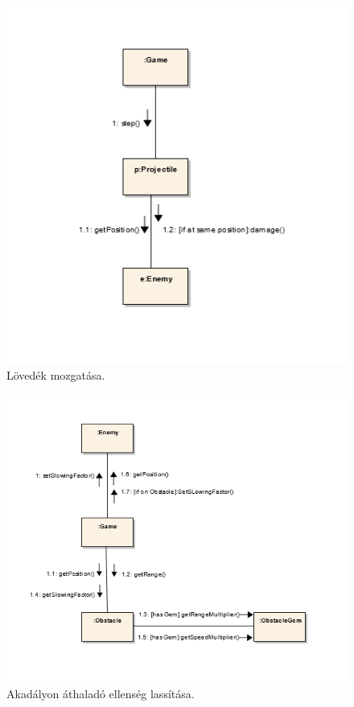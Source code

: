 \begin{figure}[H]
\begin{center}
\includegraphics{images/ch05/projectileMoveKomm.png}
\caption{Lövedék mozgatása.}
\label{fig:projectileMoveKomm}
\end{center}
\end{figure}

\begin{figure}[H]
\begin{center}
\includegraphics{images/ch05/slowKomm.png}
\caption{Akadályon áthaladó ellenség lassítása.}
\label{fig:slowKomm}
\end{center}
\end{figure}

